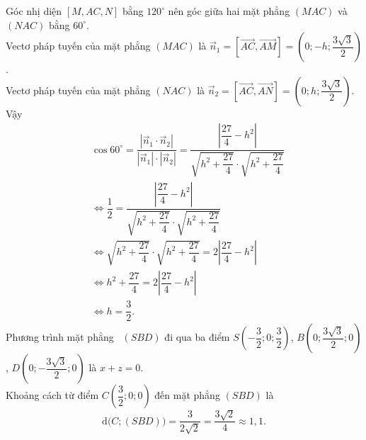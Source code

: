 \begin{ex}
{	\noindent
		Góc nhị diện $\left[M, AC, N\right]$ bằng $120^\circ$ nên góc giữa hai mặt phẳng $(MAC)$ và $(NAC)$ bằng $60^\circ$. \\ 
		Vectơ pháp tuyến của mặt phẳng $(MAC)$ là $\overrightarrow{n}_1=\left[\overrightarrow{AC}, \overrightarrow{AM}\right]=\left(0;-h;\dfrac{3\sqrt{3}}{2}\right)$.\\
		Vectơ pháp tuyến của mặt phẳng $(NAC)$ là $\overrightarrow{n}_2=\left[\overrightarrow{AC}, \overrightarrow{AN}\right]=\left(0;h;\dfrac{3\sqrt{3}}{2}\right)$.\\
		Vậy 
		\begin{align*}
			& \cos 60^\circ =\dfrac{\left|\overrightarrow{n}_1\cdot{\overrightarrow{n}_2}\right|}{\left|\overrightarrow{n}_1\right|\cdot \left|\overrightarrow{n}_2\right|}=\dfrac{\left| \dfrac{27}{4}-h^2\right|}{\sqrt{h^2+\dfrac{27}{4}}\cdot \sqrt{h^2+\dfrac{27}{4}}}  \\
			& \Leftrightarrow \dfrac{1}{2}=\dfrac{\left| \dfrac{27}{4}-h^2\right|}{\sqrt{h^2+\dfrac{27}{4}}\cdot \sqrt{h^2+\dfrac{27}{4}}} \\ 
			& \Leftrightarrow \sqrt{h^2+\dfrac{27}{4}}\cdot \sqrt{h^2+\dfrac{27}{4}}=2\left| \dfrac{27}{4}-h^2\right| \\ 
			& \Leftrightarrow h^2+\dfrac{27}{4}=2\left| \dfrac{27}{4}-h^2\right| \\ 
			& \Leftrightarrow h=\dfrac{3}{2}. 
		\end{align*}
		Phương trình mặt phẳng  $(SBD)$ đi qua ba điểm $S\left(-\dfrac{3}{2};0;\dfrac{3}{2}\right)$, $B\left(0;\dfrac{3\sqrt{3}}{2};0\right)$, $D\left(0;-\dfrac{3\sqrt{3}}{2};0\right)$ là $x+z=0$.\\
		Khoảng cách từ điểm $C\left(\dfrac{3}{2};0;0\right)$ đến mặt phẳng $(SBD)$ là
		\[
		\mathrm{d}\big(C;(SBD)\big)=\dfrac{3}{2\sqrt{2}}=\dfrac{3\sqrt{2}}{4}\approx 1{,}1. 
		\]
	}
\end{ex}

